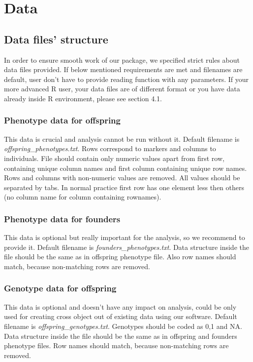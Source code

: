\documentclass{article}
\begin{document}
\section{Data}
\begin{multicols}{2}
\subsection{Data files' structure}
{\noindent}In order to ensure smooth work of our package, we specified strict rules about data files provided. If below mentioned requirements are met and filenames are default, user don't have to provide reading function with any parameters. If your more advanced R user, your data files are of different format or you have data already inside R environment, please see section 4.1. 
\subsubsection{Phenotype data for offspring}
This data is crucial and analysis cannot be run without it. Default filename is \emph{offspring\_phenotypes.txt}. Rows correspond to markers and columns to individuals. File should contain only numeric values apart from first row, containing unique column names and first column containing unique row names. Rows and columns with non-numeric values are removed. All values should be separated by tabs. In normal practice first row has one element less then others (no column name for column containing rownames).
\subsubsection{Phenotype data for founders}
This data is optional but really important for the analysis, so we recommend to provide it. Default filename is \emph{founders\_phenotypes.txt}. Data structure inside the file should be the same as in offspring phenotype file. Also row names should match, because non-matching rows are removed.
\subsubsection{Genotype data for offspring}
This data is optional and doesn't have any impact on analysis, could be only used for creating cross object out of existing data using our software. Default filename is \emph{offspring\_genotypes.txt}. Genotypes should be coded as 0,1 and NA. Data structure inside the file should be the same as in offspring and founders phenotype files. Row names should match, because non-matching rows are removed. 

\end{multicols}
\end{document}
